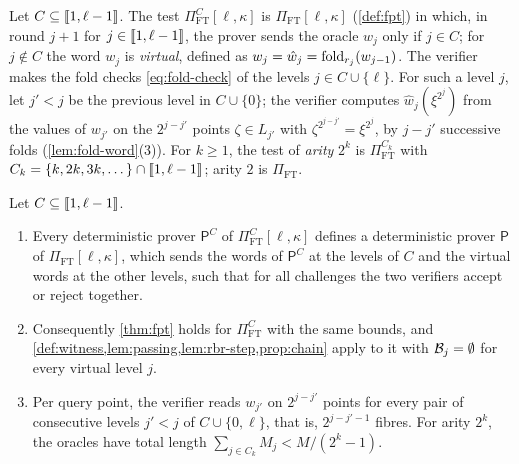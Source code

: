 \begin{definition}\label{def:fpt-arity}
Let $C \subseteq \llbracket 1, \ell-1 \rrbracket$. The test $\Pi^{C}_{\mathrm{FT}}[\ell,\kappa]$ is $\Pi_{\mathrm{FT}}[\ell,\kappa]$ (\cref{def:fpt}) in which, in round $j+1$ for $j \in \llbracket 1, \ell-1 \rrbracket$, the prover sends the oracle $w_j$ only if $j \in C$; for $j \notin C$ the word $w_j$ is \emph{virtual}, defined as $w_j = \hat w_j = \mathrm{fold}_{r_j}(w_{j-1})$.
The verifier makes the fold checks \eqref{eq:fold-check} of the levels $j \in C \cup \{\ell\}$. For such a level $j$, let $j' < j$ be the previous level in $C \cup \{0\}$; the verifier computes $\hat w_j(\xi^{2^j})$ from the values of $w_{j'}$ on the $2^{j-j'}$ points $\zeta \in L_{j'}$ with $\zeta^{2^{j-j'}} = \xi^{2^j}$, by $j - j'$ successive folds (\cref{lem:fold-word}(3)).
For $k \ge 1$, the test of \emph{arity} $2^k$ is $\Pi^{C_k}_{\mathrm{FT}}$ with $C_k = \{k, 2k, 3k, \dots\} \cap \llbracket 1, \ell-1 \rrbracket$; arity $2$ is $\Pi_{\mathrm{FT}}$.
\end{definition}

\begin{proposition}\label{prop:arity}
Let $C \subseteq \llbracket 1, \ell-1 \rrbracket$.
\begin{enumerate}
  \item Every deterministic prover $\mathsf{P}^C$ of $\Pi^C_{\mathrm{FT}}[\ell,\kappa]$ defines a deterministic prover $\mathsf{P}$ of $\Pi_{\mathrm{FT}}[\ell,\kappa]$, which sends the words of $\mathsf{P}^C$ at the levels of $C$ and the virtual words at the other levels, such that for all challenges the two verifiers accept or reject together.
  \item Consequently \cref{thm:fpt} holds for $\Pi^C_{\mathrm{FT}}$ with the same bounds, and \cref{def:witness,lem:passing,lem:rbr-step,prop:chain} apply to it with $\mathcal{B}_j = \emptyset$ for every virtual level $j$.
  \item Per query point, the verifier reads $w_{j'}$ on $2^{j-j'}$ points for every pair of consecutive levels $j' < j$ of $C \cup \{0, \ell\}$, that is, $2^{j-j'-1}$ fibres. For arity $2^k$, the oracles have total length $\sum_{j \in C_k} M_j < M/(2^k - 1)$.
\end{enumerate}
\end{proposition}

